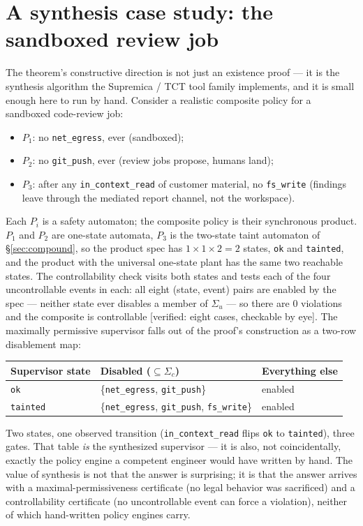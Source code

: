 \documentclass[11pt,a4paper]{article}  \usepackage{mdframed} \usepackage{graphicx} \usepackage{tabularx}
\begin{document}
\section{A synthesis case study: the sandboxed review job}\label{sec:synthesis} The theorem's constructive direction is not
just an existence proof --- it is the synthesis algorithm the Supremica / TCT tool family implements, and it is small enough
here to run by hand. Consider a realistic composite policy for a sandboxed code-review job: \begin{itemize} \item $P_1$: no
\texttt{net\_\allowbreak egress}, ever (sandboxed); \item $P_2$: no \texttt{git\_\allowbreak push}, ever (review jobs propose, humans land); \item
$P_3$: after any \texttt{in\_\allowbreak context\_\allowbreak read} of customer material, no \texttt{fs\_\allowbreak write} (findings leave through the mediated
report channel, not the workspace). \end{itemize} Each $P_i$ is a safety automaton; the composite policy is their synchronous
product. $P_1$ and $P_2$ are one-state automata, $P_3$ is the two-state taint automaton of \S\ref{sec:compound}, so the
product spec has $1\times1\times2=2$ states, \texttt{ok} and \texttt{tainted}, and the product with the universal one-state
plant has the same two reachable states. The controllability check visits both states and tests each of the four
uncontrollable events in each: all eight (state, event) pairs are enabled by the spec --- neither state ever disables a
member of $\Sigma_u$ --- so there are $0$ violations and the composite is controllable [verified: eight cases, checkable by
eye]. The maximally permissive supervisor falls out of the proof's construction as a two-row disablement map: \begin{center}
\begin{tabular}{@{}lll@{}} \toprule Supervisor state & Disabled ($\subseteq\Sigma_c$) & Everything else \\ \midrule
\texttt{ok} & \{\texttt{net\_\allowbreak egress}, \texttt{git\_\allowbreak push}\} & enabled \\ \texttt{tainted} & \{\texttt{net\_\allowbreak egress},
\texttt{git\_\allowbreak push}, \texttt{fs\_\allowbreak write}\} & enabled \\ \bottomrule \end{tabular} \end{center} Two states, one observed
transition (\texttt{in\_\allowbreak context\_\allowbreak read} flips \texttt{ok} to \texttt{tainted}), three gates. That table \emph{is} the
synthesized supervisor --- it is also, not coincidentally, exactly the policy engine a competent engineer would have written
by hand. The value of synthesis is not that the answer is surprising; it is that the answer arrives with a
maximal-permissiveness certificate (no legal behavior was sacrificed) and a controllability certificate (no uncontrollable
event can force a violation), neither of which hand-written policy engines carry.
\end{document}
